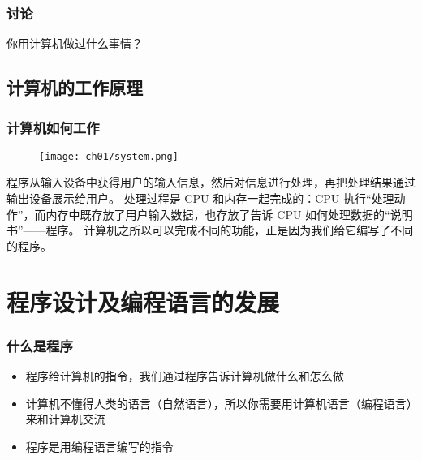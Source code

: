 \begin{frame}[fragile]
    \frametitle{讨论}

    \begin{block}{}
        \vspace{.5cm}
        \begin{center}
            {\Large 你用计算机做过什么事情？}
        \end{center}
        \vspace{.5cm}
    \end{block}
\end{frame}

\subsection{计算机的工作原理}

\begin{frame}[fragile]
    \frametitle{计算机如何工作}

    \begin{figure}
        \texttt{[image: ch01/system.png]}
    \end{figure}

    \begin{overlayarea}{\textwidth}{.2\textheight}
         {程序从输入设备中获得用户的输入信息，然后对信息进行处理，再把处理结果通过输出设备展示给用户。}
         {处理过程是 CPU 和内存一起完成的：CPU 执行“处理动作”，而内存中既存放了用户输入数据，也存放了告诉 CPU 如何处理数据的“说明书”——程序。}
         {计算机之所以可以完成不同的功能，正是因为我们给它编写了不同的程序。}
    \end{overlayarea}
\end{frame}


\section{程序设计及编程语言的发展}

\begin{frame}[fragile]
    \frametitle{什么是程序}

    \begin{itemize}[<+->]
        \item 程序给计算机的指令，我们通过程序告诉计算机做什么和怎么做
        \item 计算机不懂得人类的语言（自然语言），所以你需要用计算机语言（编程语言）来和计算机交流
        \item 程序是用编程语言编写的指令
    \end{itemize}
\end{frame}

